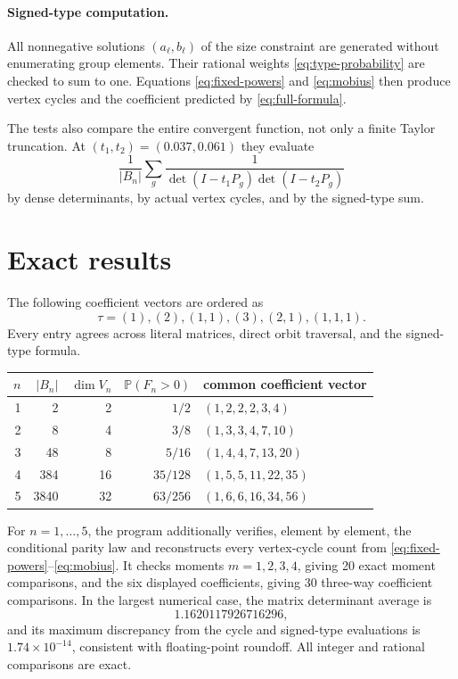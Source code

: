 \documentclass[11pt]{article}
\newcommand{\Prob}{\mathbb P}
\begin{document}
\paragraph{Signed-type computation.}
All nonnegative solutions $(a_\ell,b_\ell)$ of the size constraint are
generated without enumerating group elements.  Their rational weights
\eqref{eq:type-probability} are checked to sum to one.  Equations
\eqref{eq:fixed-powers} and \eqref{eq:mobius} then produce vertex cycles and
the coefficient predicted by \eqref{eq:full-formula}.

The tests also compare the entire convergent function, not only a finite
Taylor truncation.  At $(t_1,t_2)=(0.037,0.061)$ they evaluate
\[
\frac1{|B_n|}\sum_g
\frac1{\det(I-t_1P_g)\det(I-t_2P_g)}
\]
by dense determinants, by actual vertex cycles, and by the signed-type sum.

\section{Exact results}
The following coefficient vectors are ordered as
\[
\tau=(1),(2),(1,1),(3),(2,1),(1,1,1).
\]
Every entry agrees across literal matrices, direct orbit traversal, and the
signed-type formula.
\begin{center}
\begin{tabular}{@{}rrrrl@{}}
\toprule
$n$ & $|B_n|$ & $\dim V_n$ & $\Prob(F_n>0)$ & common coefficient vector\\
\midrule
1 & 2    & 2  & $1/2$   & $(1,2,2,2,3,4)$\\
2 & 8    & 4  & $3/8$   & $(1,3,3,4,7,10)$\\
3 & 48   & 8  & $5/16$  & $(1,4,4,7,13,20)$\\
4 & 384  & 16 & $35/128$& $(1,5,5,11,22,35)$\\
5 & 3840 & 32 & $63/256$& $(1,6,6,16,34,56)$\\
\bottomrule
\end{tabular}
\end{center}

For $n=1,\ldots,5$, the program additionally verifies, element by element,
the conditional parity law and reconstructs every vertex-cycle count from
\eqref{eq:fixed-powers}--\eqref{eq:mobius}.  It checks moments $m=1,2,3,4$,
giving 20 exact moment comparisons, and the six displayed coefficients,
giving 30 three-way coefficient comparisons.  In the largest numerical case,
the matrix determinant average is
\[
1.1620117926716296,
\]
and its maximum discrepancy from the cycle and signed-type evaluations is
$1.74\times10^{-14}$, consistent with floating-point roundoff.  All integer
and rational comparisons are exact.
\end{document}
